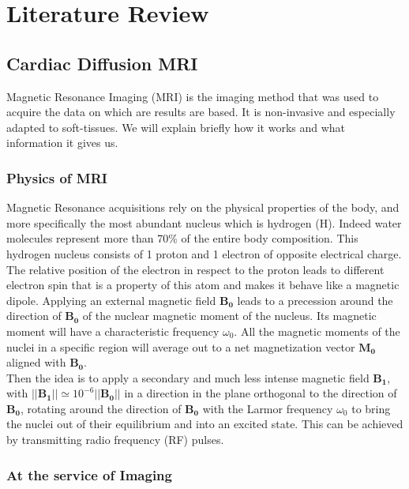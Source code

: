 \chapter{Literature Review}

\section{Cardiac Diffusion MRI}

Magnetic Resonance Imaging (MRI) is the imaging method that was used to acquire the data on which are results are based. It is non-invasive and especially adapted to soft-tissues. We will explain briefly how it works and what information it gives us.

\subsection{Physics of MRI}

Magnetic Resonance acquisitions rely on the physical properties of the body, and more specifically the most abundant nucleus which is hydrogen (H). Indeed water molecules represent more than 70\% of the entire body composition. This hydrogen nucleus consists of 1 proton and 1 electron of opposite electrical charge. The relative position of the electron in respect to the proton leads to different electron spin that is a property of this atom and makes it behave like a magnetic dipole. Applying an external magnetic field $\mathbf{B_0}$ leads to a precession around the direction of $\mathbf{B_0}$ of the nuclear magnetic moment of the nucleus. Its magnetic moment will have a characteristic frequency $\omega_0$. All the magnetic moments of the nuclei in a specific region will average out to a net magnetization vector $\mathbf{M_0}$ aligned with $\mathbf{B_0}$.\\
Then the idea is to apply a secondary and much less intense magnetic field $\mathbf{B_1}$, with $||\mathbf{B_1}|| \simeq 10^{-6}||\mathbf{B_0}||$ in a direction in the plane orthogonal to the direction of $\mathbf{B_0}$, rotating around the direction of $\mathbf{B_0}$ with the Larmor frequency $\omega_0$ to bring the nuclei out of their equilibrium and into an excited state. This can be achieved by transmitting radio frequency (RF) pulses.\\

\subsection{At the service of Imaging}

